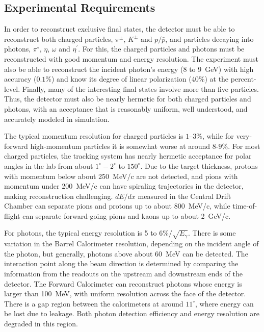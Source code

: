 \subsection[Experimental Requirements]{Experimental Requirements \label{sec:intro:requirements}}
In order to reconstruct exclusive final states, the \gx{} detector must be able to reconstruct both charged particles, $\pi^{\pm}$, $K^{\pm}$ and $p/\bar{p}$, and particles decaying into photons, $\pi^{\circ}$, $\eta$, $\omega$ and $\eta^{\prime}$. For this, the charged particles and photons must be reconstructed with good momentum and energy resolution. The experiment must also be able to reconstruct the incident photon's energy (8 to 9~GeV) with high accuracy ($0.1$\%) and know its degree of linear polarization (40\%) at the percent-level. Finally, many of the interesting final states involve more than five particles. Thus, the \gx{} detector must also be nearly hermetic for both charged particles and photons, with an acceptance that is reasonably uniform, well understood, and accurately modeled in simulation.

The typical momentum resolution for charged particles is $1$--$3\%$, while for very-forward high-momentum particles it is somewhat worse at around $8$-$9\%$. For most charged particles, the tracking system has nearly hermetic acceptance for polar angles in the lab from about $1^\circ-2^{\circ}$ to $150^{\circ}$. Due to the target thickness, protons with momentum below about 250~MeV/c are not detected, and pions with momentum under 200~MeV/c can have spiraling trajectories in the detector, making reconstruction challenging. $dE/dx$ measured in the Central Drift Chamber can separate pions and protons up to about 800~MeV/c, while time-of-flight can separate forward-going pions and kaons up to about 2~GeV/c.

For photons, the typical energy resolution is 5 to 6\%$/\sqrt{E_{\gamma}}$. There is some variation in the Barrel Calorimeter resolution, depending on the incident angle of the photon, but generally, photons above about 60~MeV can be detected. The interaction point along the beam direction is determined by comparing the information from the readouts on the upstream and downstream ends of the detector. The Forward Calorimeter can reconstruct photons whose energy is larger than 100~MeV, with uniform resolution across the face of the detector. There is a gap region between the calorimeters at around $11^{\circ}$, where energy can be lost due to leakage. Both photon detection efficiency and energy resolution are degraded in this region. 
 
